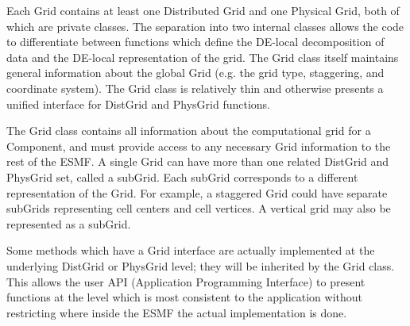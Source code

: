 


Each Grid contains at least one Distributed Grid and one Physical Grid, both
of which are private classes.
The separation into two internal classes allows the code to differentiate
between functions which define the DE-local decomposition of data and
the DE-local representation of the grid.  The Grid class itself maintains
general information about the global Grid (e.g. the grid type, staggering,
and coordinate system).  The Grid class is relatively thin and
otherwise presents a unified interface for DistGrid and PhysGrid
functions.

The Grid class contains all information about the computational grid
for a Component, and must provide access to any necessary Grid information
to the rest of the ESMF.  A single Grid can have more than one related
DistGrid and PhysGrid set, called a subGrid.  Each subGrid corresponds to
a different representation of the Grid.  For example, a staggered Grid could
have separate subGrids representing cell centers and cell vertices.  A
vertical grid may also be represented as a subGrid.

Some methods which have a Grid interface are actually implemented
at the underlying DistGrid or PhysGrid level; they will be inherited
by the Grid class.  This allows the user API (Application Programming
Interface) to present functions at the level which is most consistent
to the application without restricting where inside the ESMF the actual
implementation is done.
